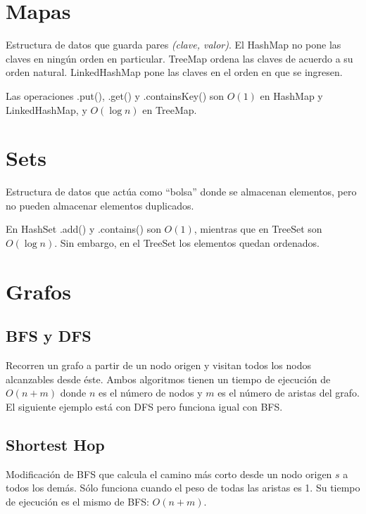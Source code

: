 \documentclass{article}
\begin{document}
\begin{multicols}{2}

\tableofcontents

\section{Mapas}
Estructura de datos que guarda pares \emph{(clave, valor)}. El HashMap no pone las claves en ningún orden en particular. TreeMap ordena las claves de acuerdo a su orden natural. LinkedHashMap pone las claves en el orden en que se ingresen.

Las operaciones .put(), .get() y .containsKey() son \( O(1) \) en HashMap y LinkedHashMap, y \( O(\log n)\) en TreeMap.


\section{Sets}
Estructura de datos que actúa como ``bolsa'' donde se almacenan elementos, pero no pueden almacenar elementos duplicados.

En HashSet .add() y .contains() son \( O(1) \), mientras que en TreeSet son \( O(\log n)\). Sin embargo, en el TreeSet los elementos quedan ordenados.


\section{Grafos}
	\subsection{BFS y DFS}
	Recorren un grafo a partir de un nodo origen y visitan todos los nodos alcanzables desde éste. Ambos algoritmos tienen un tiempo de ejecución de \( O(n + m) \) donde \( n \) es el número de nodos y \( m \) es el número de aristas del grafo. El siguiente ejemplo está con DFS pero funciona igual con BFS.	
	

	\subsection{Shortest Hop}
	Modificación de BFS que calcula el camino más corto desde un nodo origen \(s\) a todos los demás. Sólo funciona cuando el peso de todas las aristas es 1. Su tiempo de ejecución es el mismo de BFS: \( O(n + m) \).
	
	

\end{multicols}
\end{document}
